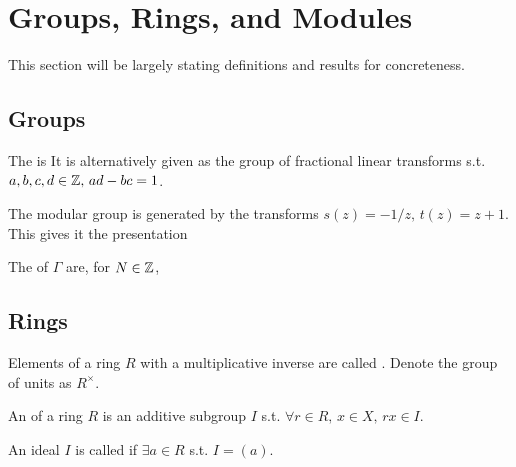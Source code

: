 \documentclass{article}
\begin{document}
\section{Groups, Rings, and Modules}

This section will be largely stating definitions and results for concreteness. 
\subsection{Groups}

\begin{definition}
	The  is 
It is alternatively given as the group of fractional linear transforms 
s.t. $a,b,c,d \in \mathbb{Z}, \, ad-bc=1$. 
\end{definition}

\begin{lemma}
	The modular group is generated by the transforms $s(z) = -1/z, \, t(z) = z+1$. This gives it the presentation 
\end{lemma}

\begin{definition}
	The  of $\Gamma$ are, for $N \in \mathbb{Z}$, 
\end{definition} 
\subsection{Rings}

\begin{definition}
	Elements of a ring $R$ with a multiplicative inverse are called . Denote the group of units as $R^\times$. 
\end{definition}


\begin{definition}
	An  of a ring $R$ is an additive subgroup $I$ s.t. $\forall r \in R, \, x \in X,\, rx \in I$. 
\end{definition}

\begin{definition}
	An ideal $I$ is called  if $\exists a \in R$ s.t. $I = (a)$.  
\end{definition}
\end{document}
